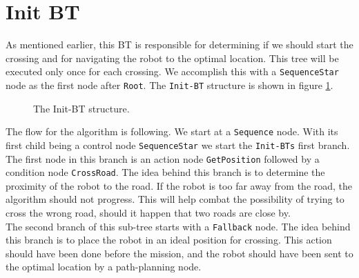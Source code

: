 \section{Init BT}
\label{sec:Init-BT}
    As mentioned earlier, this BT is responsible for determining if we should start the crossing and for navigating the robot to the optimal location. This tree will be executed only once for each crossing. We accomplish this with a \texttt{SequenceStar} node as the first node after \texttt{Root}. The \texttt{Init-BT} structure is shown in figure \ref{fig:Init-BT}.\\
    \begin{figure}[ht]
        \caption{The Init-BT structure.}
        \label{fig:Init-BT}
    \end{figure}
    The flow for the algorithm is following. We start at a \texttt{Sequence} node. With its first child being a control node \texttt{SequenceStar} we start the \texttt{Init-BTs} first branch. The first node in this branch is an action node \texttt{GetPosition} followed by a condition node \texttt{CrossRoad}. The idea behind this branch is to determine the proximity of the robot to the road. If the robot is too far away from the road, the algorithm should not progress. This will help combat the possibility of trying to cross the wrong road, should it happen that two roads are close by.\\
    The second branch of this sub-tree starts with a \texttt{Fallback} node. The idea behind this branch is to place the robot in an ideal position for crossing. This action should have been done before the mission, and the robot should have been sent to the optimal location by a path-planning node.\\
